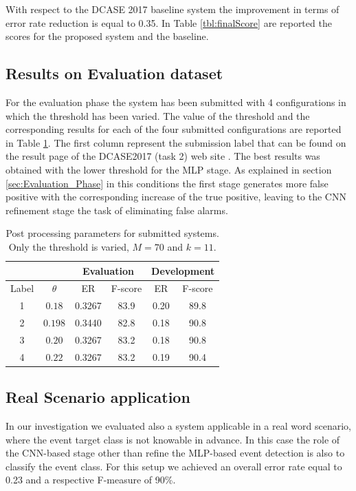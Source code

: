 \documentclass{article}
\begin{document}
\begin{sloppy}
With respect to the DCASE 2017 baseline system the improvement in terms of error rate reduction is equal to 0.35. In Table \ref{tbl:finalScore} are reported the scores for the proposed system and the baseline.

\subsection{Results on Evaluation dataset}
For the evaluation phase the system has been submitted with 4 configurations in which the threshold has been varied. The value of the threshold and the corresponding results for each of the four submitted configurations are reported in Table \ref{tbl:submitted-params}. The first column represent the submission label that can be found on the result page of the DCASE2017 (task 2) web site \cite{dcase2017webResultsTask2}.
The best results was obtained with the lower threshold for the MLP stage. As explained in section \ref{sec:Evaluation_Phase} in this conditions the first stage generates more false positive with the corresponding increase of the true positive, leaving to the CNN refinement stage the task of eliminating false alarms.

\begin{table}[t]
	\caption{Post processing parameters for submitted systems. Only the threshold is varied, $M = 70$ and $k=11$.}
	\label{tbl:submitted-params}
	\centering
	\footnotesize
	\begin{tabular} {| c | c | c | c | c | c | }
		\hline
 		& & \multicolumn{2}{c|}{Evaluation}&\multicolumn{2}{c|}{Development}\\
 		\hline 
		Label &$\theta$    & ER &  F-score & ER &  F-score\\  
		\hline

		1 &$0.18$  &0.3267&83.9 &0.20&89.8 \\
		\hline                                     
		2 &$0.198$ &0.3440&	82.8&0.18&90.8  \\
		\hline
		3 &$0.20$  &0.3267 &	83.2 &	0.18&	90.8\\
		\hline   
		4 &$0.22$ &0.3267	&83.2 &	0.19&	90.4\\
		\hline                                       
	\end{tabular}
\end{table}


\subsection{Real Scenario application}
In our investigation we evaluated also a system applicable in a real word scenario, where the event target class is not knowable in advance. In this case the role of the CNN-based stage other than refine the MLP-based event detection is also to classify the event class. For this setup we achieved an overall error rate equal to 0.23 and a respective F-measure of 90\%.


\end{sloppy}
\end{document}
